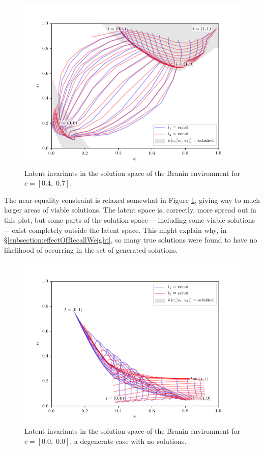 \documentclass[../../main.tex]{subfiles}
\begin{document}
\begin{figure}[H]
    \begin{center}
    \includegraphics[width=\textwidth]{latentPlot0407}
    \caption{
        Latent invariants in the solution space of the Branin environment for $c=[0.4,\;0.7]$.
    }
    \label{fig:latentPlot0407}
    \end{center}
\end{figure}
The near-equality constraint is relaxed somewhat in Figure \ref{fig:latentPlot0407}, giving way to much larger areas of viable solutions.
The latent space is, correctly, more spread out in this plot, but some parts of the solution space $-$ including some viable solutions $-$ exist completely outside the latent space.
This might explain why, in \S\ref{subsection:effectOfRecallWeight}, so many true solutions were found to have no likelihood of occurring in the set of generated solutions.
\begin{figure}[H]
    \begin{center}
    \includegraphics[width=\textwidth]{latentPlot0000}
    \caption{
        Latent invariants in the solution space of the Branin environment for $c=[0.0,\;0.0]$, a degenerate case with no solutions.
    }
    \label{fig:latentPlot0000}
    \end{center}
\end{figure}
\end{document}
